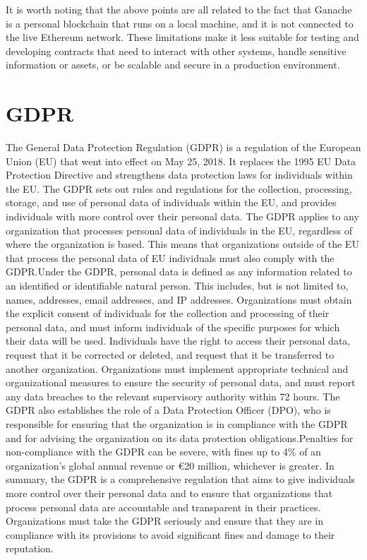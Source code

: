 \documentclass[target=mst,aauheader=]{thud}
\begin{document}
It is worth noting that the above points are all related to the fact that Ganache is a personal blockchain that runs on a local machine, and it is not connected to the live Ethereum network. These limitations make it less suitable for testing and developing contracts that need to interact with other systems, handle sensitive information or assets, or be scalable and secure in a production environment.

\chapter{GDPR}
\label{appendixGDPR}

The General Data Protection Regulation (GDPR) is a regulation of the European Union (EU) that went into effect on May 25, 2018. It replaces the 1995 EU Data Protection Directive and strengthens data protection laws for individuals within the EU. The GDPR sets out rules and regulations for the collection, processing, storage, and use of personal data of individuals within the EU, and provides individuals with more control over their personal data.
The GDPR applies to any organization that processes personal data of individuals in the EU, regardless of where the organization is based. This means that organizations outside of the EU that process the personal data of EU individuals must also comply with the GDPR.Under the GDPR, personal data is defined as any information related to an identified or identifiable natural person. This includes, but is not limited to, names, addresses, email addresses, and IP addresses.
Organizations must obtain the explicit consent of individuals for the collection and processing of their personal data, and must inform individuals of the specific purposes for which their data will be used. Individuals have the right to access their personal data, request that it be corrected or deleted, and request that it be transferred to another organization.
Organizations must implement appropriate technical and organizational measures to ensure the security of personal data, and must report any data breaches to the relevant supervisory authority within 72 hours.
The GDPR also establishes the role of a Data Protection Officer (DPO), who is responsible for ensuring that the organization is in compliance with the GDPR and for advising the organization on its data protection obligations.Penalties for non-compliance with the GDPR can be severe, with fines up to 4\% of an organization's global annual revenue or €20 million, whichever is greater.
In summary, the GDPR is a comprehensive regulation that aims to give individuals more control over their personal data and to ensure that organizations that process personal data are accountable and transparent in their practices. Organizations must take the GDPR seriously and ensure that they are in compliance with its provisions to avoid significant fines and damage to their reputation.
\end{document}
